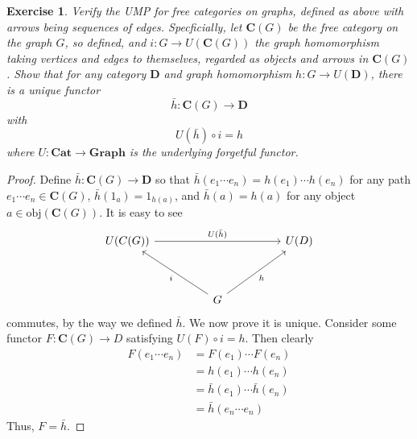 \documentclass[a4paper, 11pt]{book}
\theoremstyle{plain}
\newtheorem{exercise}{Exercise}[chapter]
\theoremstyle{plain}
\newcommand{\mb}{\mathbf}
\newcommand{\arr}{\rightarrow}
\newcommand{\obj}{\text{obj}}
\newcommand{\C}{\mathbf{C}}
\newcommand{\D}{\mb{D}}
\begin{document}
    \begin{exercise}
      Verify the UMP for free categories on graphs, defined as above with arrows being sequences of edges. Specficially, let $\mb{C}(G)$ be the free category on the graph $G$, so defined, and $i:G \arr U(\mb{C}(G))$ the graph homomorphism taking vertices and edges to themselves, regarded as objects and arrows in $\mb{C}(G)$. Show that for any category $\mb{D}$ and graph homomorphism $h:G \arr U(\mb{D})$, there is a unique functor $$\bar{h}: \C(G) \arr \D$$ with $$U(\bar{h}) \circ i=h$$ where $U: \mb{Cat} \arr \mb{Graph}$ is the underlying forgetful functor.
    \end{exercise}
    \begin{proof}
      Define $\bar{h}:\C(G) \arr \D$ so that $\bar{h}(e_1\cdots e_n)=h(e_1) \cdots h(e_n)$ for any path $e_1\cdots e_n \in \C(G)$, $\bar{h}(1_a)=1_{h(a)}$, and $\bar{h}(a)=h(a)$ for any object $a \in \obj(\C(G))$. It is easy to see 
      \[\begin{tikzcd}
        {U(C(G))} &&&& {U(D)} \\
        \\
        && G
        \arrow["i", from=3-3, to=1-1]
        \arrow["h"', from=3-3, to=1-5]
        \arrow["{U(\bar{h})}", from=1-1, to=1-5]
      \end{tikzcd}\]
      commutes, by the way we defined $\bar{h}$. We now prove it is unique. Consider some functor $F:\C(G) \arr D$ satisfying $U(F) \circ i=h$. Then clearly 
      \begin{align*}
        F(e_1\cdots e_n) &=F(e_1)\cdots F(e_n) \\
        &=h(e_1) \cdots h(e_n) \\
        &=\bar{h}(e_1) \cdots \bar{h}(e_n) \\
        &=\bar{h} (e_n \cdots e_n)
      \end{align*}
      Thus, $F=\bar{h}$.
    \end{proof}
\end{document}
